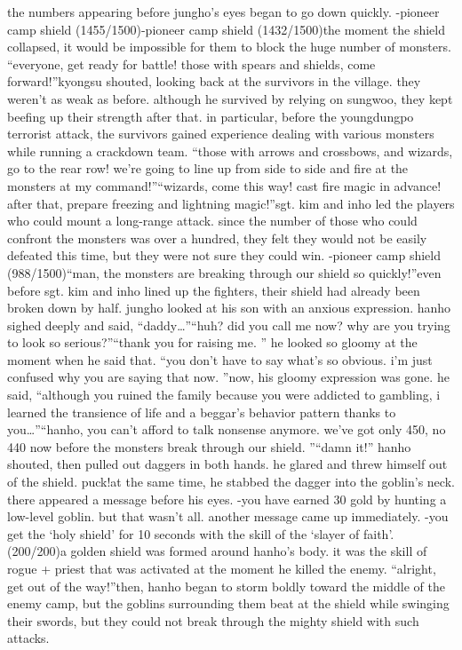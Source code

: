the numbers appearing before jungho’s eyes began to go down quickly.
-pioneer camp shield (1455/1500)-pioneer camp shield (1432/1500)the moment the shield collapsed, it would be impossible for them to block the huge number of monsters.
“everyone, get ready for battle! those with spears and shields, come forward!”kyongsu shouted, looking back at the survivors in the village.
they weren’t as weak as before.
 although he survived by relying on sungwoo, they kept beefing up their strength after that.
in particular, before the youngdungpo terrorist attack, the survivors gained experience dealing with various monsters while running a crackdown team.
“those with arrows and crossbows, and wizards, go to the rear row! we’re going to line up from side to side and fire at the monsters at my command!”“wizards, come this way! cast fire magic in advance! after that, prepare freezing and lightning magic!”sgt.
 kim and inho led the players who could mount a long-range attack.
 since the number of those who could confront the monsters was over a hundred, they felt they would not be easily defeated this time, but they were not sure they could win.
-pioneer camp shield (988/1500)“man, the monsters are breaking through our shield so quickly!”even before sgt.
 kim and inho lined up the fighters, their shield had already been broken down by half.
jungho looked at his son with an anxious expression.
hanho sighed deeply and said, “daddy…”“huh? did you call me now? why are you trying to look so serious?”“thank you for raising me.
”
he looked so gloomy at the moment when he said that.
“you don’t have to say what’s so obvious.
 i’m just confused why you are saying that now.
”now, his gloomy expression was gone.
he said, “although you ruined the family because you were addicted to gambling, i learned the transience of life and a beggar’s behavior pattern thanks to you…”“hanho, you can’t afford to talk nonsense anymore.
 we’ve got only 450, no 440 now before the monsters break through our shield.
”“damn it!” hanho shouted, then pulled out daggers in both hands.
 he glared and threw himself out of the shield.
puck!at the same time, he stabbed the dagger into the goblin’s neck.
there appeared a message before his eyes.
-you have earned 30 gold by hunting a low-level goblin.
but that wasn’t all.
 another message came up immediately.
-you get the ‘holy shield’ for 10 seconds with the skill of the ‘slayer of faith’.
 (200/200)a golden shield was formed around hanho’s body.
 it was the skill of rogue + priest that was activated at the moment he killed the enemy.
“alright, get out of the way!”then, hanho began to storm boldly toward the middle of the enemy camp, but the goblins surrounding them beat at the shield while swinging their swords, but they could not break through the mighty shield with such attacks.
